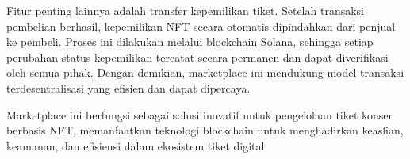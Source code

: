 Fitur penting lainnya adalah transfer kepemilikan tiket. Setelah transaksi pembelian berhasil, kepemilikan NFT secara otomatis dipindahkan dari penjual ke pembeli. Proses ini dilakukan melalui blockchain Solana, sehingga setiap perubahan status kepemilikan tercatat secara permanen dan dapat diverifikasi oleh semua pihak. Dengan demikian, marketplace ini mendukung model transaksi terdesentralisasi yang efisien dan dapat dipercaya.

Marketplace ini berfungsi sebagai solusi inovatif untuk pengelolaan tiket konser berbasis NFT, memanfaatkan teknologi blockchain untuk menghadirkan keaslian, keamanan, dan efisiensi dalam ekosistem tiket digital.



